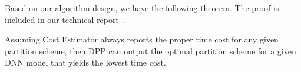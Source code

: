 
                
                         
         
        

Based on our algorithm design, we have the following theorem. The proof is included in our technical report~\cite{flexpie-tech}.
\begin{theorem}[Optimality]
    Assuming Cost Estimator always reports the proper time cost for any given partition scheme, then DPP can output the optimal partition scheme for a given DNN model that yields the lowest time cost.
\end{theorem}

